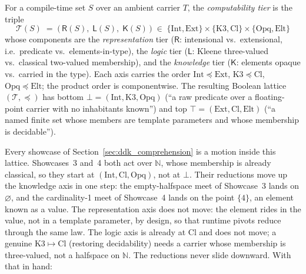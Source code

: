 \documentclass[11pt, a4paper]{article}
\begin{document}
\begin{definition}
\label{def:computability-tier}
For a compile-time set $S$ over an ambient carrier $T$, the
\emph{computability tier} is the triple
\[
  \mathcal{T}(S) \;=\; \bigl(\,\mathsf{R}(S),\; \mathsf{L}(S),\; \mathsf{K}(S)\,\bigr)
  \;\in\; \{\mathrm{Int},\mathrm{Ext}\} \times \{\mathrm{K3},\mathrm{Cl}\} \times \{\mathrm{Opq},\mathrm{Elt}\}
\]
whose components are the \emph{representation} tier ($\mathsf{R}$:
intensional vs.\ extensional, i.e.\ predicate vs.\ elements-in-type),
the \emph{logic} tier ($\mathsf{L}$: Kleene three-valued vs.\
classical two-valued membership), and the \emph{knowledge} tier
($\mathsf{K}$: elements opaque vs.\ carried in the type). Each axis
carries the order $\mathrm{Int} \preceq \mathrm{Ext}$,
$\mathrm{K3} \preceq \mathrm{Cl}$,
$\mathrm{Opq} \preceq \mathrm{Elt}$; the product order is
componentwise. The resulting Boolean lattice $(\mathcal{T}, \preceq)$
has bottom $\bot = (\mathrm{Int},\mathrm{K3},\mathrm{Opq})$ (``a raw
predicate over a floating-point carrier with no inhabitants known'')
and top $\top = (\mathrm{Ext},\mathrm{Cl},\mathrm{Elt})$ (``a named
finite set whose members are template parameters and whose membership
is decidable'').
\end{definition}

Every showcase of Section~\ref{sec:ddk_comprehension} is a motion inside this
lattice.
Showcases~3 and~4 both act over $\mathbb{N}$, whose membership is already classical, so they start at $(\mathrm{Int},\mathrm{Cl},\mathrm{Opq})$, not at $\bot$.
Their reductions move up the knowledge axis in one step: the empty-halfspace meet of Showcase~3 lands on $\varnothing$, and the cardinality-1 meet of Showcase~4 lands on the point $\{4\}$, an element known as a value.
The representation axis does not move: the element rides in the value, not in a template parameter, by design, so that runtime pivots reduce through the same law.
The logic axis is already at $\mathrm{Cl}$ and does not move; a genuine $\mathrm{K3} \mapsto \mathrm{Cl}$ (restoring decidability) needs a carrier whose membership is three-valued, not a halfspace on $\mathbb{N}$.
The reductions never slide downward. With that in hand:
\end{document}
